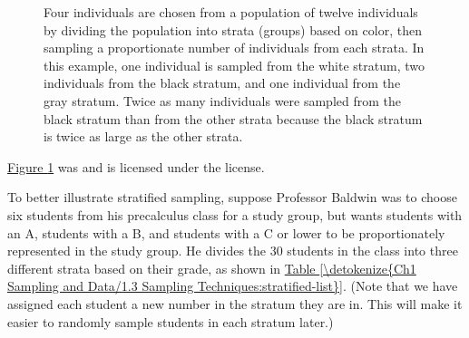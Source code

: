 \documentclass[letterpaper,10pt,english]{jupyterBook}
\begin{document}
\begin{figure}[htbp]
\centering
\capstart

\noindent{}
\caption{Four individuals are chosen from a population of twelve individuals by dividing the population into strata (groups) based on color, then sampling a proportionate number of individuals from each strata. In this example, one individual is sampled from the white stratum, two individuals from the black stratum, and one individual from the gray stratum. Twice as many individuals were sampled from the black stratum than from the other strata because the black stratum is twice as large as the other strata.\sphinxfootnotemark[4]}\label{\detokenize{Ch1 Sampling and Data/1.3 Sampling Techniques:id9}}\end{figure}
%
\begin{footnotetext}[4]\sphinxAtStartFootnote
\hyperref[\detokenize{Ch1 Sampling and Data/1.3 Sampling Techniques:id9}]{Figure \ref{\detokenize{Ch1 Sampling and Data/1.3 Sampling Techniques:id9}}} was  and is licensed under the  license.
%
\end{footnotetext}\ignorespaces 
\sphinxAtStartPar
To better illustrate stratified sampling, suppose Professor Baldwin was to choose six students from his precalculus class for a study group, but wants students with an A, students with a B, and students with a C or lower to be proportionately represented in the study group. He divides the 30 students in the class into three different strata based on their grade, as shown in \hyperref[\detokenize{Ch1 Sampling and Data/1.3 Sampling Techniques:stratified-list}]{Table \ref{\detokenize{Ch1 Sampling and Data/1.3 Sampling Techniques:stratified-list}}}. (Note that we have assigned each student a new number in the stratum they are in. This will make it easier to randomly sample students in each stratum later.)
\end{document}
